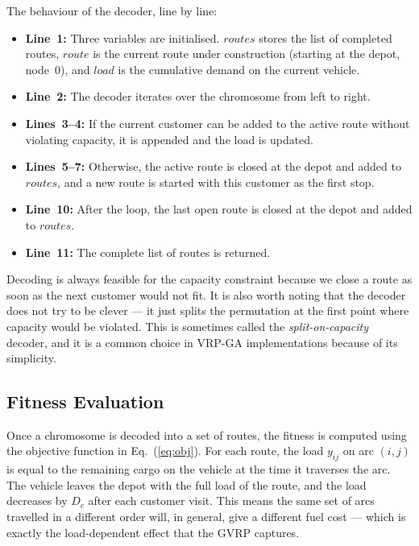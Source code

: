 \documentclass [a4paper, 11pt, titlepage] {article}
\begin{document}
The behaviour of the decoder, line by line:

\begin{itemize}
    \item \textbf{Line~1:} Three variables are initialised. $routes$ stores the list of completed routes, $route$ is the current route under construction (starting at the depot, node~$0$), and $load$ is the cumulative demand on the current vehicle.
    \item \textbf{Line~2:} The decoder iterates over the chromosome from left to right.
    \item \textbf{Lines~3--4:} If the current customer can be added to the active route without violating capacity, it is appended and the load is updated.
    \item \textbf{Lines~5--7:} Otherwise, the active route is closed at the depot and added to $routes$, and a new route is started with this customer as the first stop.
    \item \textbf{Line~10:} After the loop, the last open route is closed at the depot and added to $routes$.
    \item \textbf{Line~11:} The complete list of routes is returned.
\end{itemize}

Decoding is always feasible for the capacity constraint because we close a route as soon as the next customer would not fit. It is also worth noting that the decoder does not try to be clever --- it just splits the permutation at the first point where capacity would be violated. This is sometimes called the \emph{split-on-capacity} decoder, and it is a common choice in VRP-GA implementations because of its simplicity.

\subsection{Fitness Evaluation}
\label{sec:fitness}

Once a chromosome is decoded into a set of routes, the fitness is computed using the objective function in Eq.~(\ref{eq:obj}). For each route, the load $y_{ij}$ on arc $(i,j)$ is equal to the remaining cargo on the vehicle at the time it traverses the arc. The vehicle leaves the depot with the full load of the route, and the load decreases by $D_c$ after each customer visit. This means the same set of arcs travelled in a different order will, in general, give a different fuel cost --- which is exactly the load-dependent effect that the GVRP captures.
\end{document}

